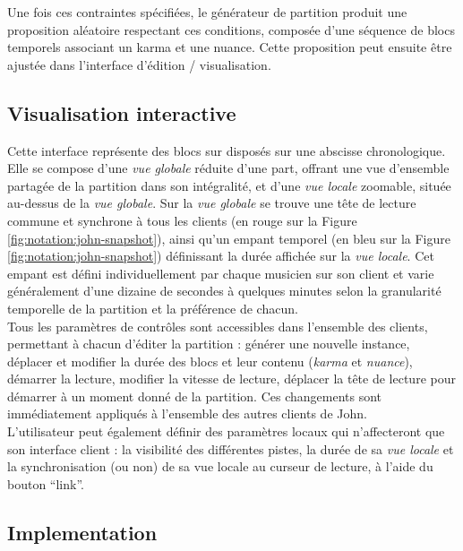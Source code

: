 \noindent Une fois ces contraintes spécifiées, le générateur de partition produit une proposition aléatoire respectant ces conditions, composée d'une séquence de blocs temporels associant un karma et une nuance. Cette proposition peut ensuite être ajustée dans l'interface d'édition / visualisation.

\subsection{Visualisation interactive}

\noindent Cette interface représente des blocs sur disposés sur une abscisse chronologique. Elle se compose d'une \textit{vue globale} réduite d'une part, offrant une vue d'ensemble partagée de la partition dans son intégralité, et d'une \textit{vue locale} zoomable, située au-dessus de la \textit{vue globale}. Sur la \textit{vue globale} se trouve une tête de lecture commune et synchrone à tous les clients (en rouge sur la Figure \ref{fig:notation:john-snapshot}), ainsi qu'un empant temporel (en bleu sur la Figure \ref{fig:notation:john-snapshot}) définissant la durée affichée sur la \textit{vue locale}. Cet empant est défini individuellement par chaque musicien sur son client et varie généralement d'une dizaine de secondes à quelques minutes selon la granularité temporelle de la partition et la préférence de chacun.\\
\indent Tous les paramètres de contrôles sont accessibles dans l'ensemble des clients, permettant à chacun d'éditer la partition : générer une nouvelle instance, déplacer et modifier la durée des blocs et leur contenu (\textit{karma} et \textit{nuance}), démarrer la lecture, modifier la vitesse de lecture, déplacer la tête de lecture pour démarrer à un moment donné de la partition. Ces changements sont immédiatement appliqués à l'ensemble des autres clients de John.\\
\indent L'utilisateur peut également définir des paramètres locaux qui n'affecteront que son interface client : la visibilité des différentes pistes, la durée de sa \textit{vue locale} et la synchronisation (ou non) de sa vue locale au curseur de lecture, à l'aide du bouton ``link''.

\subsection{Implementation}

